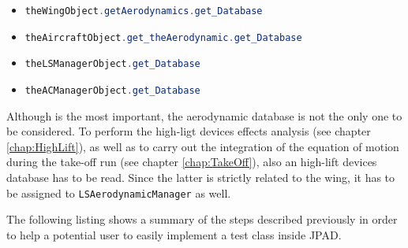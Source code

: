 %
\begin{itemize}
\item \lstinline[language=Java]!theWingObject.getAerodynamics.get_Database!
\item \lstinline[language=Java]!theAircraftObject.get_theAerodynamic.get_Database!
\item \lstinline[language=Java]!theLSManagerObject.get_Database!
\item \lstinline[language=Java]!theACManagerObject.get_Database!
\end{itemize}
%
Although is the most important, the aerodynamic database is not the only one to be considered. To perform the high-ligt devices effects analysis (see chapter \ref{chap:HighLift}), as well as to carry out the integration of the equation of motion during the take-off run (see chapter \ref{chap:TakeOff}), also an high-lift devices database has to be read. Since the latter is strictly related to the wing, it has to be assigned to \lstinline[language=Java]!LSAerodynamicManager! as well.

\bigskip
\noindent
The following listing shows a summary of the steps described previously in order to help a potential user to easily implement a test class inside \gls{JPAD}.

